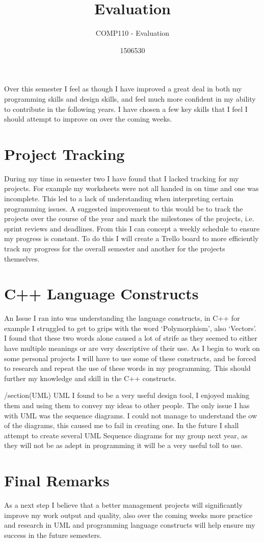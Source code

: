 \documentclass{scrartcl}
\title{Evaluation}
\subtitle{COMP110 - Evaluation}
\author{1506530}
\begin{document}
\maketitle
Over this semester I feel as though I have improved a great deal in both my programming skills and design skills, and feel much more confident in my ability to contribute in the following years. I have chosen a few key skills that I feel I should attempt to improve on over the coming weeks.

\section{Project Tracking}
During my time in semester two I have found that I lacked tracking for my projects.
For  example  my  worksheets  were  not  all  handed  in  on  time  and  one  was  incomplete.
This led to a lack of understanding when interpreting certain programming issues.  A
suggested improvement to this would be to track the projects over the course of the year
and mark the milestones of the projects, i.e.  sprint reviews and deadlines. From this I
can concept a weekly schedule to ensure my progress is constant. To do this I will create a Trello board to more efficiently track my progress for the overall semester and another for the projects themselves.

\section{C++ Language Constructs}
An Issue I ran into was understanding the language constructs, in C++ for example I
struggled to get to grips with the word `Polymorphism', also `Vectors'.  I found that these
two words alone caused a lot of strife as they seemed to either have multiple meanings
or are very descriptive of their use.  As I begin to work on some personal projects I will have to use some of these constructs, and be forced to research
and repeat the use of these words in my programming. This should further my knowledge and skill in the C++ constructs.

/section(UML)
UML I found to be a very useful design tool, I enjoyed making them and using them
to convey my ideas to other people.  The only issue I has with UML was the sequence
diagrams.  I could not manage to understand the  ow of the diagrams, this caused me
to fail in creating one. In the future I shall attempt to create several UML Sequence
diagrams for my group next year, as they will not be as adept in programming it will
be a very useful toll to use.

\section{Final Remarks}
As a next step I believe that a better management projects will significantly improve
my  work  output  and  quality,  also  over the coming weeks  more  practice  and  research  in  UML  and
programming language constructs will help ensure my success in the future semesters. 




\end{document}
